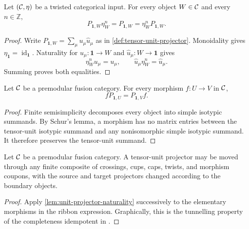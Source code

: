 \begin{lemma}
\label{lem:unit-projector-absorbs-character}
Let \((\mathcal{C},\eta)\) be a twisted categorical input.
For every object $W\in\mathcal{C}$ and every $n\in\mathbb Z$,
\[
  P_{\mathbf1,W}\eta_W^n=P_{\mathbf1,W}
  =\eta_W^nP_{\mathbf1,W}.
\]
\end{lemma}

\begin{proof}
Write $P_{\mathbf1,W}=\sum_\mu u_\mu\widehat u_\mu$ as in
\cref{def:tensor-unit-projector}.  Monoidality gives
$\eta_{\mathbf1}=\operatorname{id}_{\mathbf1}$.  Naturality for
$u_\mu\colon\mathbf1\to W$ and
$\widehat u_\mu\colon W\to\mathbf1$ gives
\[
  \eta_W^n u_\mu=u_\mu,
  \qquad
  \widehat u_\mu\eta_W^n=\widehat u_\mu.
\]
Summing proves both equalities.
\end{proof}

\begin{lemma}
\label{lem:unit-projector-naturality}
Let \(\mathcal{C}\) be a premodular fusion category.
For every morphism $f\colon U\to V$ in $\mathcal{C}$,
\[
  fP_{\mathbf1,U}=P_{\mathbf1,V}f.
\]
\end{lemma}

\begin{proof}
Finite semisimplicity decomposes every object into simple isotypic summands.
By Schur's lemma, a morphism has no matrix entries between the tensor-unit
isotypic summand and any nonisomorphic simple isotypic summand.  It therefore
preserves the tensor-unit summand.
\end{proof}

\begin{corollary}
\label{cor:finite-unit-projector-transport}
Let \(\mathcal{C}\) be a premodular fusion category.
A tensor-unit projector may be moved through any finite composite of
crossings, cups, caps, twists, and morphism coupons, with the source and
target projectors changed according to the boundary objects.
\end{corollary}

\begin{proof}
Apply \cref{lem:unit-projector-naturality} successively to the elementary
morphisms in the ribbon expression.  Graphically, this is the tunnelling
property of the completeness idempotent in
\cite[Lemmas~2.27--2.28]{Tham2021}.
\end{proof}

